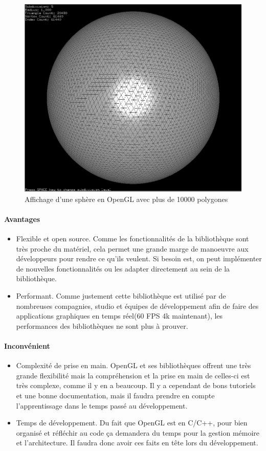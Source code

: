 \documentclass[a4paper]{article}
\begin{document}
\begin{figure}[!h]
\begin{center}\includegraphics[width=0.49\linewidth]{img/icosphere.png} \end{center}
\caption{Affichage d'une sphère en OpenGL avec plus de 10000 polygones}
\end{figure}

\paragraph{Avantages}
    \begin{itemize}
                \item {Flexible et open source.}
                Comme les fonctionnalités de la bibliothèque sont très proche du matériel, cela permet une grande marge de manoeuvre aux développeurs pour rendre ce qu'ils veulent. Si besoin est, on peut implémenter de nouvelles fonctionnalités ou les adapter directement au sein de la bibliothèque.
                
                \item {Performant.}
                Comme justement cette bibliothèque est utilisé par de nombreuses compagnies, studio et équipes de développement afin de faire des applications graphiques en temps réel(60 FPS 4k maintenant), les performances des bibliothèques ne sont plus à prouver.
    \end{itemize}

\paragraph{Inconvénient}
    \begin{itemize}
                \item {Complexité de prise en main.} 
                OpenGL et ses bibliothèques offrent une très grande flexibilité mais la compréhension et la prise en main de celles-ci est très complexe, comme il y en a beaucoup. Il y a cependant de bons tutoriels et une bonne documentation, mais il faudra prendre en compte l'apprentissage dans le temps passé au développement.
                
                \item {Temps de développement.}
                Du fait que OpenGL est en C/C++, pour bien organisé et réfléchir au code ça demandera du temps pour la gestion mémoire et l'architecture. Il faudra donc avoir ces faits en tête lors du développement.
                
    \end{itemize}
\newpage
\end{document}
